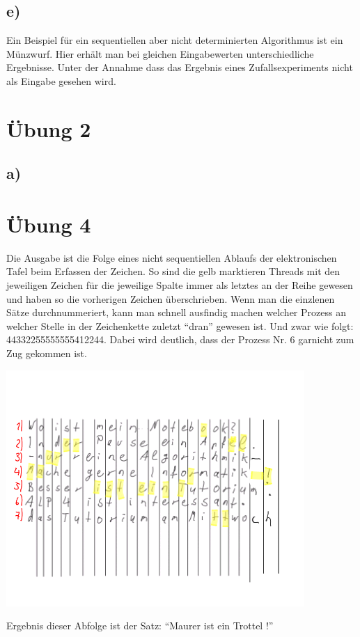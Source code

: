 \documentclass[11pt,a4paper,DIV=10,]{scrartcl}
\begin{document}
\subsection*{e)}
Ein Beispiel für ein sequentiellen aber nicht determinierten Algorithmus ist ein Münzwurf. Hier erhält man bei gleichen Eingabewerten unterschiedliche Ergebnisse. Unter der Annahme dass das Ergebnis eines Zufallsexperiments nicht als Eingabe gesehen wird. 


\section*{Übung 2}
\subsection{a)}


\section*{Übung 4}
Die Ausgabe ist die Folge eines nicht sequentiellen Ablaufs der elektronischen Tafel beim Erfassen der Zeichen. So sind die gelb marktieren Threads mit den jeweiligen Zeichen für die jeweilige Spalte immer als letztes an der Reihe gewesen und haben so die vorherigen Zeichen überschrieben. Wenn man die einzlenen Sätze durchnummeriert, kann man schnell ausfindig machen welcher Prozess an welcher Stelle in der Zeichenkette zuletzt ``dran'' gewesen ist. Und zwar wie folgt: 44332255555555412244. Dabei wird deutlich, dass der Prozess Nr. 6 garnicht zum Zug gekommen ist. 

\includegraphics{picture_a4.png}

Ergebnis dieser Abfolge ist der Satz: ``Maurer ist ein Trottel !''
\end{document}
